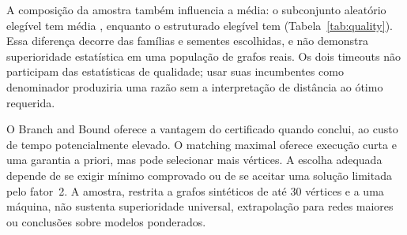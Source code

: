 A composição da amostra também influencia a média:
o subconjunto aleatório elegível tem média
\RandomMeanRatio{}, enquanto o estruturado elegível tem
\StructuredMeanRatio{} (Tabela~\ref{tab:quality}).
Essa diferença decorre das famílias e sementes escolhidas,
e não demonstra superioridade estatística em uma população
de grafos reais. Os dois timeouts não participam das
estatísticas de qualidade; usar suas incumbentes como
denominador produziria uma razão sem a interpretação
de distância ao ótimo requerida.

O Branch and Bound oferece a vantagem do certificado
quando conclui, ao custo de tempo potencialmente elevado.
O matching maximal oferece execução curta e uma garantia
a priori, mas pode selecionar mais vértices. A escolha
adequada depende de se exigir mínimo comprovado ou de
se aceitar uma solução limitada pelo fator~2. A amostra,
restrita a grafos sintéticos de até 30 vértices e a uma
máquina, não sustenta superioridade universal, extrapolação
para redes maiores ou conclusões sobre modelos ponderados.
